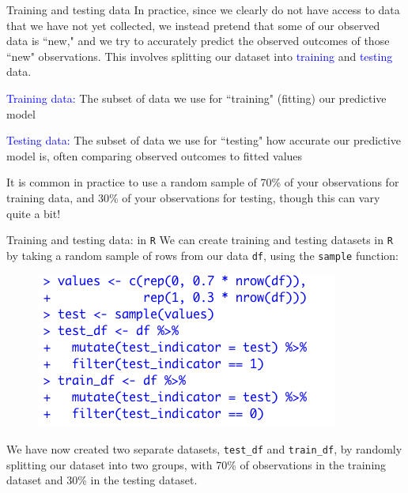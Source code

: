 \documentclass[10pt,t]{beamer}
\begin{document}
\begin{frame}{Training and testing data}
In practice, since we clearly do not have access to data that we have not yet collected, we instead pretend that some of our observed data is ``new," and we try to accurately predict the observed outcomes of those ``new" observations. This involves splitting our dataset into \textcolor{blue}{training} and \textcolor{blue}{testing} data.

\vspace{0.3cm}

\textcolor{blue}{Training data:} The subset of data we use for ``training" (fitting) our predictive model

\vspace{0.3cm}

\textcolor{blue}{Testing data:} The subset of data we use for ``testing" how accurate our predictive model is, often comparing observed outcomes to fitted values

\vspace{0.3cm}

It is common in practice to use a random sample of 70\% of your observations for training data, and 30\% of your observations for testing, though this can vary quite a bit!

\end{frame}

\begin{frame}{Training and testing data: in \texttt{R}}
We can create training and testing datasets in \texttt{R} by taking a random sample of rows from our data \texttt{df}, using the \texttt{sample} function:

\vspace{0.1cm}

\begin{figure}
	\centering \includegraphics[scale=0.5]{traintest.png}
\end{figure}

\vspace{0.1cm}

We have now created two separate datasets, \texttt{test\_df} and \texttt{train\_df}, by randomly splitting our dataset into two groups, with 70\% of observations in the training dataset and 30\% in the testing dataset.

\end{frame}
\end{document}
